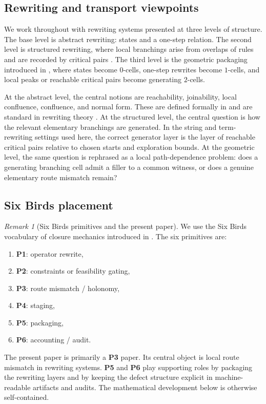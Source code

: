 \documentclass[11pt]{article}
\numberwithin{equation}{section}
\theoremstyle{definition}
\theoremstyle{remark}
\newtheorem{remark}[theorem]{Remark}
\begin{document}
\subsection{Rewriting and transport viewpoints}

We work throughout with rewriting systems presented at three levels of structure. The base level is abstract rewriting: states and a one-step relation. The second level is structured rewriting, where local branchings arise from overlaps of rules and are recorded by critical pairs \cite{KnuthBendix1970,BaaderNipkow1998,Terese2003}. The third level is the geometric packaging introduced in , where states become $0$-cells, one-step rewrites become $1$-cells, and local peaks or reachable critical pairs become generating $2$-cells.

At the abstract level, the central notions are reachability, joinability, local confluence, confluence, and normal form. These are defined formally in  and are standard in rewriting theory \cite{BaaderNipkow1998,Huet1980,DershowitzJouannaud1990,Terese2003}. At the structured level, the central question is how the relevant elementary branchings are generated. In the string and term-rewriting settings used here, the correct generator layer is the layer of reachable critical pairs relative to chosen starts and exploration bounds. At the geometric level, the same question is rephrased as a local path-dependence problem: does a generating branching cell admit a filler to a common witness, or does a genuine elementary route mismatch remain?

\subsection{Six Birds placement}
\label{subsec:six-birds-placement}

\begin{remark}[Six Birds primitives and the present paper]
\label{rem:six-birds-primitives}
We use the Six Birds vocabulary of closure mechanics introduced in \cite{Tsiokos2026SixBirdsFoundations}. The six primitives are:
\begin{enumerate}
    \item \textbf{P1}: operator rewrite,
    \item \textbf{P2}: constraints or feasibility gating,
    \item \textbf{P3}: route mismatch / holonomy,
    \item \textbf{P4}: staging,
    \item \textbf{P5}: packaging,
    \item \textbf{P6}: accounting / audit.
\end{enumerate}
The present paper is primarily a \textbf{P3} paper. Its central object is local route mismatch in rewriting systems. \textbf{P5} and \textbf{P6} play supporting roles by packaging the rewriting layers and by keeping the defect structure explicit in machine-readable artifacts and audits. The mathematical development below is otherwise self-contained.
\end{remark}
\end{document}
